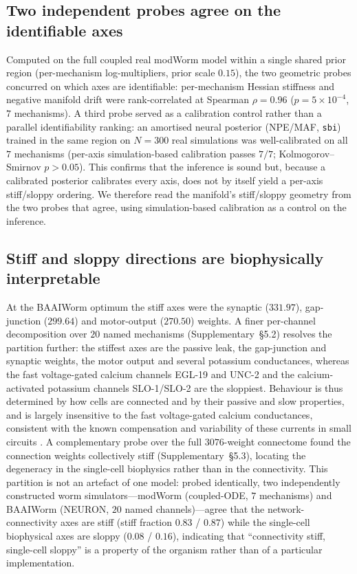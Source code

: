 \documentclass[11pt]{article}
\begin{document}
\subsection*{Two independent probes agree on the identifiable axes}
Computed on the full coupled real modWorm model within a single shared prior region (per-mechanism log-multipliers, prior scale $0.15$), the two geometric probes concurred on which axes are identifiable: per-mechanism Hessian stiffness and negative manifold drift were rank-correlated at Spearman $\rho{=}0.96$ ($p{=}5\times10^{-4}$, $7$ mechanisms). A third probe served as a calibration control rather than a parallel identifiability ranking: an amortised neural posterior (NPE/MAF, \texttt{sbi}) trained in the same region on $N{=}300$ real simulations was well-calibrated on all $7$ mechanisms (per-axis simulation-based calibration passes $7/7$; Kolmogorov--Smirnov $p>0.05$). This confirms that the inference is sound but, because a calibrated posterior calibrates every axis, does not by itself yield a per-axis stiff/sloppy ordering. We therefore read the manifold's stiff/sloppy geometry from the two probes that agree, using simulation-based calibration as a control on the inference.

\subsection*{Stiff and sloppy directions are biophysically interpretable}
At the BAAIWorm optimum the stiff axes were the synaptic ($331.97$), gap-junction ($299.64$) and motor-output ($270.50$) weights. A finer per-channel decomposition over $20$ named mechanisms (Supplementary~\S5.2) resolves the partition further: the stiffest axes are the passive leak, the gap-junction and synaptic weights, the motor output and several potassium conductances, whereas the fast voltage-gated calcium channels EGL-19 and UNC-2 and the calcium-activated potassium channels SLO-1/SLO-2 are the sloppiest. Behaviour is thus determined by how cells are connected and by their passive and slow properties, and is largely insensitive to the fast voltage-gated calcium conductances, consistent with the known compensation and variability of these currents in small circuits \citep{marder2006variability}. A complementary probe over the full $3076$-weight connectome found the connection weights collectively stiff (Supplementary~\S5.3), locating the degeneracy in the single-cell biophysics rather than in the connectivity. This partition is not an artefact of one model: probed identically, two independently constructed worm simulators---modWorm (coupled-ODE, $7$ mechanisms) and BAAIWorm (NEURON, $20$ named channels)---agree that the network-connectivity axes are stiff (stiff fraction $0.83$ / $0.87$) while the single-cell biophysical axes are sloppy ($0.08$ / $0.16$), indicating that ``connectivity stiff, single-cell sloppy'' is a property of the organism rather than of a particular implementation.
\end{document}
